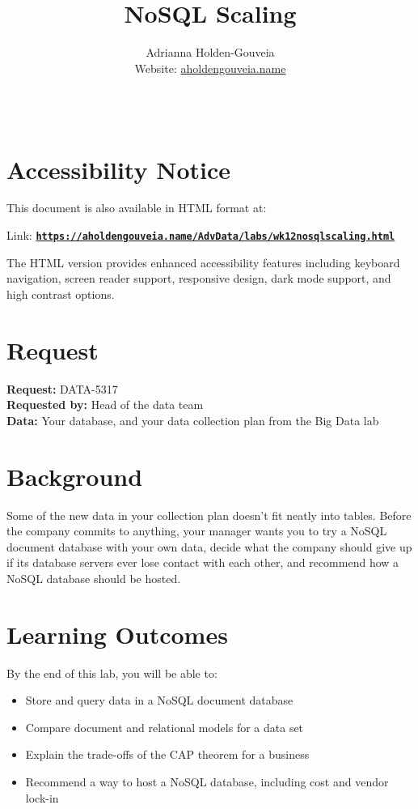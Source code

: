 \documentclass[12pt]{article}
\title{NoSQL Scaling}
\author{
        Adrianna Holden-Gouveia \\
        Website: \href{https://aholdengouveia.name}{aholdengouveia.name}\\ 
        \date{\vspace{-5ex}}
        \faGithub {: aholdengouveia} \\
        }
\begin{document}
    

\maketitle



\section*{Accessibility Notice}
This document is also available in HTML format at:

Link: \href{https://aholdengouveia.name/AdvData/labs/wk12nosqlscaling.html}{\textbf{\nolinkurl{https://aholdengouveia.name/AdvData/labs/wk12nosqlscaling.html}}}

The HTML version provides enhanced accessibility features including keyboard navigation, screen reader support, responsive design, dark mode support, and high contrast options.

\section*{Request}
\noindent\textbf{Request:} DATA-5317\\
\textbf{Requested by:} Head of the data team\\
\textbf{Data:} Your database, and your data collection plan from the Big Data lab

\section*{Background}
Some of the new data in your collection plan doesn't fit neatly into tables. Before the company commits to anything, your manager wants you to try a NoSQL document database with your own data, decide what the company should give up if its database servers ever lose contact with each other, and recommend how a NoSQL database should be hosted.

\section*{Learning Outcomes}
By the end of this lab, you will be able to:
\begin{itemize}
    \item Store and query data in a NoSQL document database
    \item Compare document and relational models for a data set
    \item Explain the trade-offs of the CAP theorem for a business
    \item Recommend a way to host a NoSQL database, including cost and vendor lock-in
\end{itemize}
\end{document}
